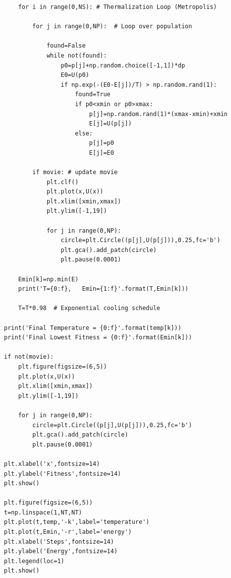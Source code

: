 \begin{verbatim}
    for i in range(0,NS): # Thermalization Loop (Metropolis)
        
        for j in range(0,NP):  # Loop over population

            found=False
            while not(found):
                p0=p[j]+np.random.choice([-1,1])*dp
                E0=U(p0)
                if np.exp(-(E0-E[j])/T) > np.random.rand(1):
                    found=True
                    if p0<xmin or p0>xmax:
                        p[j]=np.random.rand(1)*(xmax-xmin)+xmin
                        E[j]=U(p[j])
                    else:
                        p[j]=p0
                        E[j]=E0

        if movie: # update movie
            plt.clf()
            plt.plot(x,U(x))
            plt.xlim([xmin,xmax])
            plt.ylim([-1,19])

            for j in range(0,NP):
                circle=plt.Circle((p[j],U(p[j])),0.25,fc='b')
                plt.gca().add_patch(circle)
                plt.pause(0.0001)

    Emin[k]=np.min(E)
    print('T={0:f},   Emin={1:f}'.format(T,Emin[k]))
    
    T=T*0.98  # Exponential cooling schedule

print('Final Temperature = {0:f}'.format(temp[k]))
print('Final Lowest Fitness = {0:f}'.format(Emin[k]))
    
if not(movie):
    plt.figure(figsize=(6,5))
    plt.plot(x,U(x))
    plt.xlim([xmin,xmax])
    plt.ylim([-1,19])

    for j in range(0,NP):
        circle=plt.Circle((p[j],U(p[j])),0.25,fc='b')
        plt.gca().add_patch(circle)
        plt.pause(0.0001)

plt.xlabel('x',fontsize=14)
plt.ylabel('Fitness',fontsize=14)
plt.show()
    
plt.figure(figsize=(6,5))
t=np.linspace(1,NT,NT)
plt.plot(t,temp,'-k',label='temperature')
plt.plot(t,Emin,'-r',label='energy')
plt.xlabel('Steps',fontsize=14)
plt.ylabel('Energy',fontsize=14)
plt.legend(loc=1)
plt.show()
\end{verbatim}
\normalsize



